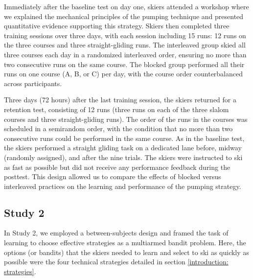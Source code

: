 Immediately after the baseline test on day one, skiers attended a workshop where we explained the mechanical principles of the pumping technique and presented quantitative evidence supporting this strategy. Skiers then completed three training sessions over three days, with each session including 15 runs: 12 runs on the three courses and three straight-gliding runs. The interleaved group skied all three courses each day in a randomized interleaved order, ensuring no more than two consecutive runs on the same course. The blocked group performed all their runs on one course (A, B, or C) per day, with the course order counterbalanced across participants. 

Three days (72 hours) after the last training session, the skiers returned for a retention test, consisting of 12 runs (three runs on each of the three slalom courses and three straight-gliding runs). The order of the runs in the courses was scheduled in a semirandom order, with the condition that no more than two consecutive runs could be performed in the same course. As in the baseline test, the skiers performed a straight gliding task on a dedicated lane before, midway (randomly assigned), and after the nine trials. The skiers were instructed to ski as fast as possible but did not receive any performance feedback during the posttest. This design allowed us to compare the effects of blocked versus interleaved practices on the learning and performance of the pumping strategy. 


\subsection{Study 2}
In Study 2, we employed a between-subjects design and framed the task of learning to choose effective strategies as a multiarmed bandit problem\cite{sutton_reinforcement_2018}. Here, the options (or bandits) that the skiers needed to learn and select to ski as quickly as possible were the four technical strategies detailed in section \ref{introduction: strategies}.

